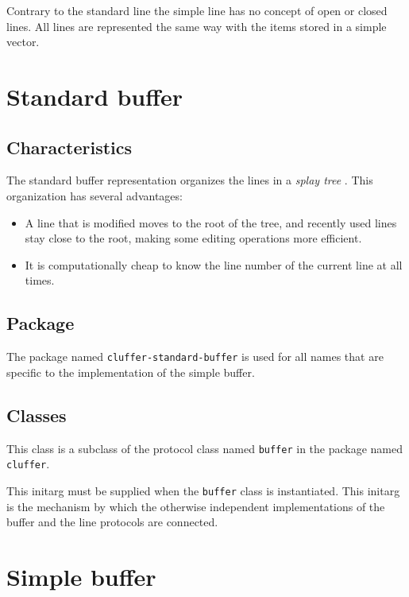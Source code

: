 Contrary to the standard line
 the simple line has no
concept of open or closed lines.  All lines are represented the same
way with the items stored in a simple \commonlisp{} vector.

\section{Standard buffer}
\label{sec-implementation-standard-buffer}

\subsection{Characteristics}

The standard buffer representation organizes the lines in a
\emph{splay tree} \cite{Sleator:1985:SBS:3828.3835}.  This
organization has several advantages:

\begin{itemize}
\item A line that is modified moves to the root of the tree, and
  recently used lines stay close to the root, making some editing
  operations more efficient.
\item It is computationally cheap to know the line number of the
  current line at all times.
\end{itemize}

\subsection{Package}

The package named \texttt{cluffer-standard-buffer} is used for all
names that are specific to the implementation of the simple buffer.

\subsection{Classes}


This class is a subclass of the protocol class named \texttt{buffer} in
the package named \texttt{cluffer}.


This initarg must be supplied when the \texttt{buffer} class is
instantiated.  This initarg is the mechanism by which the otherwise
independent implementations of the buffer and the line protocols are
connected.

\section{Simple buffer}
\label{sec-implementation-simple-buffer}


